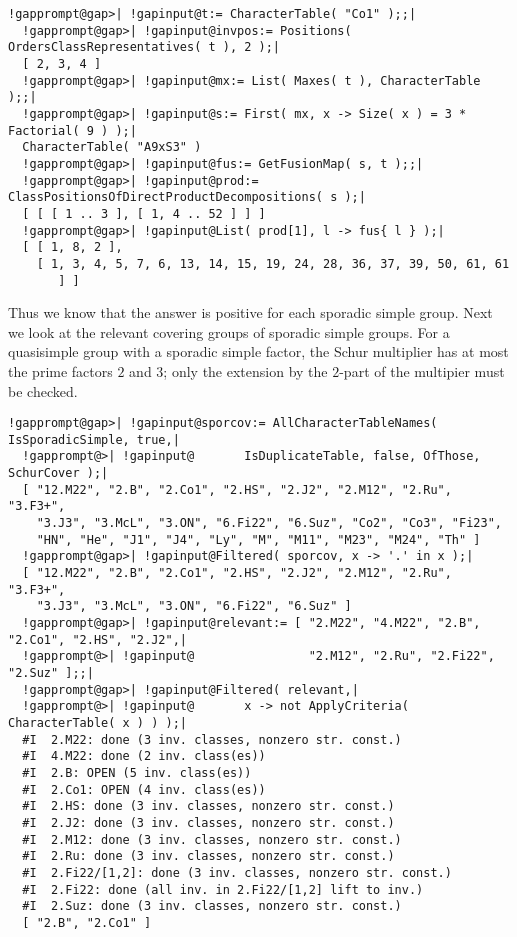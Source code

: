 \documentclass[a4paper,11pt]{report}
\begin{document}
{{{ 
\begin{Verbatim}[commandchars=!@|,fontsize=\small,frame=single,label=Example]
  !gapprompt@gap>| !gapinput@t:= CharacterTable( "Co1" );;|
  !gapprompt@gap>| !gapinput@invpos:= Positions( OrdersClassRepresentatives( t ), 2 );|
  [ 2, 3, 4 ]
  !gapprompt@gap>| !gapinput@mx:= List( Maxes( t ), CharacterTable );;|
  !gapprompt@gap>| !gapinput@s:= First( mx, x -> Size( x ) = 3 * Factorial( 9 ) );|
  CharacterTable( "A9xS3" )
  !gapprompt@gap>| !gapinput@fus:= GetFusionMap( s, t );;|
  !gapprompt@gap>| !gapinput@prod:= ClassPositionsOfDirectProductDecompositions( s );|
  [ [ [ 1 .. 3 ], [ 1, 4 .. 52 ] ] ]
  !gapprompt@gap>| !gapinput@List( prod[1], l -> fus{ l } );|
  [ [ 1, 8, 2 ], 
    [ 1, 3, 4, 5, 7, 6, 13, 14, 15, 19, 24, 28, 36, 37, 39, 50, 61, 61 
       ] ]
\end{Verbatim}
  

 Thus we know that the answer is positive for each sporadic simple group. Next
we look at the relevant covering groups of sporadic simple groups. For a
quasisimple group with a sporadic simple factor, the Schur multiplier has at
most the prime factors $2$ and $3$; only the extension by the $2$-part of the multipier must be checked. 

 
\begin{Verbatim}[commandchars=!@|,fontsize=\small,frame=single,label=Example]
  !gapprompt@gap>| !gapinput@sporcov:= AllCharacterTableNames( IsSporadicSimple, true,|
  !gapprompt@>| !gapinput@       IsDuplicateTable, false, OfThose, SchurCover );|
  [ "12.M22", "2.B", "2.Co1", "2.HS", "2.J2", "2.M12", "2.Ru", "3.F3+", 
    "3.J3", "3.McL", "3.ON", "6.Fi22", "6.Suz", "Co2", "Co3", "Fi23", 
    "HN", "He", "J1", "J4", "Ly", "M", "M11", "M23", "M24", "Th" ]
  !gapprompt@gap>| !gapinput@Filtered( sporcov, x -> '.' in x );|
  [ "12.M22", "2.B", "2.Co1", "2.HS", "2.J2", "2.M12", "2.Ru", "3.F3+", 
    "3.J3", "3.McL", "3.ON", "6.Fi22", "6.Suz" ]
  !gapprompt@gap>| !gapinput@relevant:= [ "2.M22", "4.M22", "2.B", "2.Co1", "2.HS", "2.J2",|
  !gapprompt@>| !gapinput@                "2.M12", "2.Ru", "2.Fi22", "2.Suz" ];;|
  !gapprompt@gap>| !gapinput@Filtered( relevant,|
  !gapprompt@>| !gapinput@       x -> not ApplyCriteria( CharacterTable( x ) ) );|
  #I  2.M22: done (3 inv. classes, nonzero str. const.)
  #I  4.M22: done (2 inv. class(es))
  #I  2.B: OPEN (5 inv. class(es))
  #I  2.Co1: OPEN (4 inv. class(es))
  #I  2.HS: done (3 inv. classes, nonzero str. const.)
  #I  2.J2: done (3 inv. classes, nonzero str. const.)
  #I  2.M12: done (3 inv. classes, nonzero str. const.)
  #I  2.Ru: done (3 inv. classes, nonzero str. const.)
  #I  2.Fi22/[1,2]: done (3 inv. classes, nonzero str. const.)
  #I  2.Fi22: done (all inv. in 2.Fi22/[1,2] lift to inv.)
  #I  2.Suz: done (3 inv. classes, nonzero str. const.)
  [ "2.B", "2.Co1" ]
\end{Verbatim}
 

}}}
\end{document}
